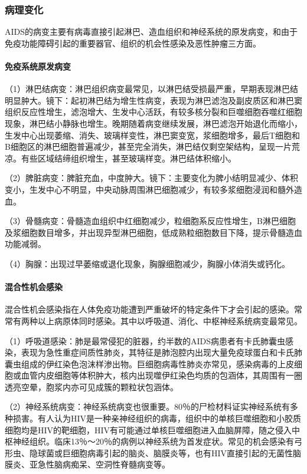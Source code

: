 \subsubsection{病理变化}

AIDS的病变主要有病毒直接引起淋巴、造血组织和神经系统的原发病变，和由于免疫功能障碍引起的重要器官、组织的机会性感染及恶性肿瘤三方面。

\paragraph{免疫系统原发病变}
（1）淋巴结病变：淋巴组织病变最常见，以淋巴结受损最严重，早期表现淋巴结明显肿大。镜下：起初淋巴结为增生性病变，表现为淋巴滤泡及副皮质区和淋巴窦组织反应性增生，滤泡增大、生发中心活跃，有较多核分裂和巨噬细胞吞噬红细胞现象，淋巴结小静脉也增生。晚期随着病变继续发展，淋巴滤泡开始退化而缩小，生发中心出现萎缩、消失、玻璃样变性，淋巴窦变宽，浆细胞增多，最后T细胞和B细胞区的淋巴细胞普遍减少，甚至完全消失，淋巴结仅剩空架结构，呈现一片荒凉。有些区域结缔组织增生，甚至玻璃样变。淋巴结体积缩小。

（2）脾脏病变：脾脏充血，中度肿大。镜下：主要变化为脾小结明显减少、体积变小，生发中心不明显，中央动脉周围淋巴细胞减少，有较多浆细胞浸润和髓外造血。

（3）骨髓病变：骨髓造血组织中红细胞减少，粒细胞系反应性增生，B淋巴细胞及浆细胞数目增多，并出现异型淋巴细胞，低成熟粒细胞数目下降，提示骨髓造血功能减弱。

（4）胸腺：出现过早萎缩或退化现象，胸腺细胞减少，胸腺小体消失或钙化。

\paragraph{混合性机会感染}
混合性机会感染指在人体免疫功能遭到严重破坏的特定条件下才会引起的感染。常常有两种以上病原体同时感染。其中以呼吸道、消化、中枢神经系统病变最常见。

（1）呼吸道感染：肺是最常侵犯的脏器，约半数的AIDS病患者有卡氏肺囊虫感染，表现为急性重症间质性肺炎，其特征是肺泡腔内出现大量免疫球蛋白和卡氏肺囊虫组成的伊红染色泡沫样渗出物。巨细胞病毒性肺炎亦常见，感染病毒的上皮细胞或血管内皮细胞等体积肿大，核内出现噬伊红染色均质的包涵体，其周围有一圈透亮空晕，胞浆内亦可见成簇的颗粒状包涵体。

（2）神经系统病变：神经系统病变也很重要。80％的尸检材料证实神经系统有多种损害。有人认为HIV是一种亲神经组织的病毒，组织中的单核巨噬细胞和小胶质细胞均是HIV的靶细胞，HIV有可能通过单核巨噬细胞进入血脑屏障，随之侵入中枢神经组织。临床13％～20％的病例以神经系统为首发症状。常见的机会感染有弓形虫、隐球菌或巨细胞病毒引起的脑炎、脑膜炎等，也有HIV直接引起的无菌性脑膜炎、亚急性脑病痴呆、空洞性脊髓病变等。

